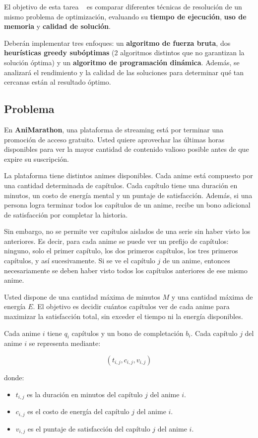 El objetivo de esta tarea \tnum~ es comparar diferentes técnicas de resolución de un mismo problema de optimización, evaluando su \textbf{tiempo de ejecución}, \textbf{uso de memoria} y \textbf{calidad de solución}.

Deberán implementar tres enfoques: un \textbf{algoritmo de fuerza bruta}, dos \textbf{heurísticas greedy subóptimas} (2 algoritmos distintos que no garantizan la solución óptima) y un \textbf{algoritmo de programación dinámica}. Además, se analizará el rendimiento y la calidad de las soluciones para determinar qué tan cercanas están al resultado óptimo.

\subsection{Problema}

En \textbf{AniMarathon}, una plataforma de streaming está por terminar una promoción de acceso gratuito. Usted quiere aprovechar las últimas horas disponibles para ver la mayor cantidad de contenido valioso posible antes de que expire su suscripción.

La plataforma tiene distintos animes disponibles. Cada anime está compuesto por una cantidad determinada de capítulos. Cada capítulo tiene una duración en minutos, un costo de energía mental y un puntaje de satisfacción. Además, si una persona logra terminar todos los capítulos de un anime, recibe un bono adicional de satisfacción por completar la historia.

Sin embargo, no se permite ver capítulos aislados de una serie sin haber visto los anteriores. Es decir, para cada anime se puede ver un prefijo de capítulos: ninguno, solo el primer capítulo, los dos primeros capítulos, los tres primeros capítulos, y así sucesivamente. Si se ve el capítulo $j$ de un anime, entonces necesariamente se deben haber visto todos los capítulos anteriores de ese mismo anime.

Usted dispone de una cantidad máxima de minutos $M$ y una cantidad máxima de energía $E$. El objetivo es decidir cuántos capítulos ver de cada anime para maximizar la satisfacción total, sin exceder el tiempo ni la energía disponibles.

Cada anime $i$ tiene $q_i$ capítulos y un bono de completación $b_i$. Cada capítulo $j$ del anime $i$ se representa mediante:

\[
(t_{i,j}, c_{i,j}, v_{i,j})
\]

donde:

\begin{itemize}
    \item $t_{i,j}$ es la duración en minutos del capítulo $j$ del anime $i$.
    \item $c_{i,j}$ es el costo de energía del capítulo $j$ del anime $i$.
    \item $v_{i,j}$ es el puntaje de satisfacción del capítulo $j$ del anime $i$.
\end{itemize}

